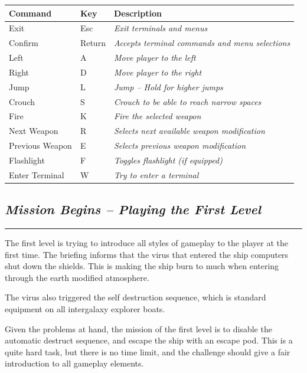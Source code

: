 \documentclass[a5paper, 10pt, titlepage, landscape, twoside, final]{article}
\begin{document}
\begin{table}[ht]
  \begin{tabular}{lll}
    \textbf{Command} & \textbf{Key} & \textbf{Description} \\
    \hline
    \hline
    Exit & Esc & \textit{Exit terminals and menus}\\
    Confirm & Return & \textit{Accepts terminal commands and menu selections}\\
    Left & A & \textit{Move player to the left}\\
    Right & D & \textit{Move player to the right}\\
    Jump & L & \textit{Jump -- Hold for higher jumps}\\
    Crouch & S & \textit{Crouch to be able to reach narrow spaces}\\
    Fire & K & \textit{Fire the selected weapon}\\
    Next Weapon & R & \textit{Selects next available weapon modification}\\
    Previous Weapon & E & \textit{Selects previous weapon modification}\\
    Flashlight & F & \textit{Toggles flashlight (if equipped)}\\
    Enter Terminal & W & \textit{Try to enter a terminal}
  \end{tabular}
\end{table}


\clearpage
\begin{center}
\subsection{\textit{Mission Begins -- Playing the First Level}}
\end{center}
\hrule\par
%
The first level is trying to introduce all styles of gameplay to the player at the first time. The briefing informs that the virus that entered the ship computers shut down the shields. This is making the ship burn to much when entering through the earth modified atmosphere.

The virus also triggered the self destruction sequence, which is standard equipment on all intergalaxy explorer boats.

Given the problems at hand, the mission of the first level is to disable the automatic destruct sequence, and escape the ship with an escape pod. This is a quite hard task, but there is no time limit, and the challenge should give a fair introduction to all gameplay elements.
\end{document}
